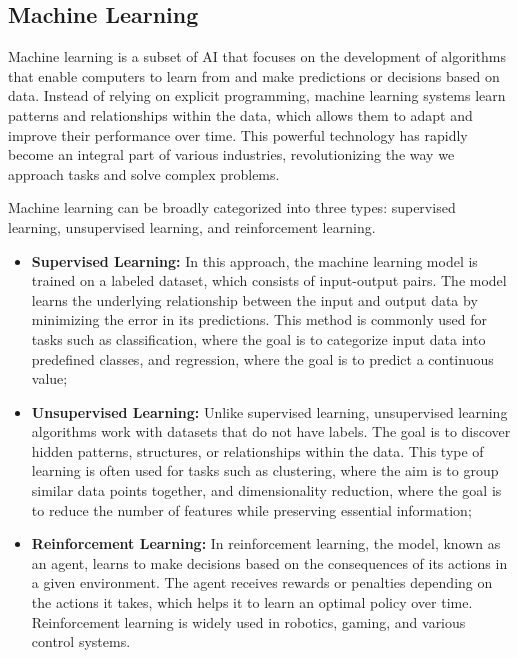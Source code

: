 \subsection{Machine Learning}
\label{subsec:ml}

Machine learning is a subset of \ac{AI} that focuses on the development of algorithms that enable computers to learn from and make predictions or decisions based on data.
Instead of relying on explicit programming, machine learning systems learn patterns and relationships within the data, which allows them to adapt and improve their performance over time.
This powerful technology has rapidly become an integral part of various industries, revolutionizing the way we approach tasks and solve complex problems.

Machine learning can be broadly categorized into three types: supervised learning, unsupervised learning, and reinforcement learning.

\begin{itemize}
    \item \textbf{Supervised Learning:} In this approach, the machine learning model is trained on a labeled dataset, which consists of input-output pairs.
        The model learns the underlying relationship between the input and output data by minimizing the error in its predictions.
        This method is commonly used for tasks such as classification, where the goal is to categorize input data into predefined classes, and regression, where the goal is to predict a continuous value;
    \item \textbf{Unsupervised Learning:} Unlike supervised learning, unsupervised learning algorithms work with datasets that do not have labels.
        The goal is to discover hidden patterns, structures, or relationships within the data.
        This type of learning is often used for tasks such as clustering, where the aim is to group similar data points together, and dimensionality reduction, where the goal is to reduce the number of features while preserving essential information;
    \item \textbf{Reinforcement Learning:} In reinforcement learning, the model, known as an agent, learns to make decisions based on the consequences of its actions in a given environment.
        The agent receives rewards or penalties depending on the actions it takes, which helps it to learn an optimal policy over time.
        Reinforcement learning is widely used in robotics, gaming, and various control systems.
\end{itemize}


